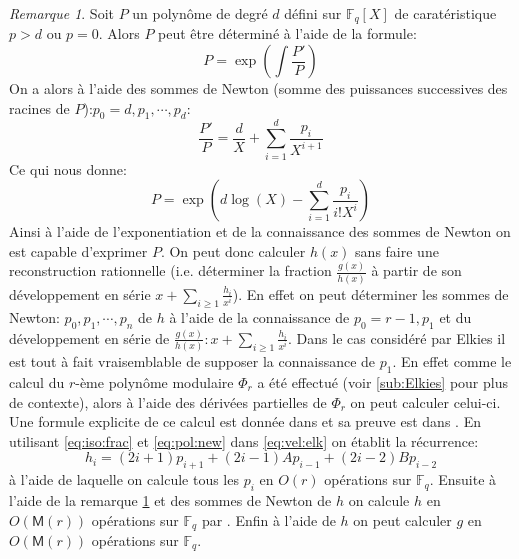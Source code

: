 \documentclass[10pt,a4paper]{book}
\theoremstyle{plain}
\theoremstyle{definition}
\theoremstyle{definition}
\theoremstyle{definition}
\theoremstyle{definition}
\theoremstyle{remark}
\newtheorem{rem}[thm]{Remarque}
\theoremstyle{remark}
\theoremstyle{definition}
\begin{document}
\begin{rem}
\label{rem:pol:rec}
Soit $P$ un polynôme de degré $d$ défini sur $\mathbb{F}_q[X]$ de caratéristique $p>d$ ou $p=0$. Alors $P$ peut être déterminé à l'aide de la formule:
\begin{equation}
P=\exp\left(\int{\frac{P'}{P}}\right)
\end{equation} 
On a alors à l'aide des sommes de Newton (somme des puissances successives des racines de $P$):$p_0=d,p_1, \cdots, p_d$:
\begin{equation}
\label{eq:pol:new}
\frac{P'}{P}= \frac{d}{X} + \sum_{i = 1}^d \frac{p_i}{X^{i+1}}
\end{equation}
Ce qui nous donne:
\begin{equation}
P=\exp\left( d \log(X) - \sum_{i = 1}^{d} \frac{p_i}{i!X^i} \right)
\end{equation} 
Ainsi à l'aide de l'exponentiation et de la connaissance des sommes de Newton 
on est capable d'exprimer $P$.
On peut donc calculer $h(x)$ sans faire une reconstruction rationnelle (i.e. déterminer 
la fraction $\frac{g(x)}{h(x)}$ à partir de son développement en série 
$x+\sum_{i \geqslant 1}\frac{h_i}{x^i}$). En effet on peut déterminer les sommes
de Newton: $p_0,p_1,\cdots, p_n$ de $h$ à l'aide de la connaissance de 
$p_0=r-1, p_1$ et du développement en série de $\frac{g(x)}{h(x)}:x+
\sum_{i \geqslant 1}\frac{h_i}{x^i}$.
Dans le cas considéré par Elkies il est tout à fait vraisemblable de supposer 
la connaissance de $p_1$. En effet comme le calcul du $r$-ème polynôme 
modulaire $\Phi_{r}$ a été effectué (voir \ref{sub:Elkies} pour plus de 
contexte), alors à l'aide des dérivées partielles de $\Phi_{r}$ on peut 
calculer celui-ci. Une formule explicite de ce calcul est donnée dans 
\cite[Theorem 17.22]{ehcc05} et sa preuve est dans \cite[§7]{Schoof95}. En 
utilisant \eqref{eq:iso:frac} et \eqref{eq:pol:new} dans \eqref{eq:vel:elk} on 
établit la récurrence:
\begin{equation}
\label{eq:p:rec}
h_i=(2i+1)p_{i+1}+(2i-1)Ap_{i-1}+(2i-2)Bp_{i-2}
\end{equation}
à l'aide de laquelle on calcule tous les $p_i$ en $O(r)$ opérations sur 
$\mathbb{F}_q$. Ensuite à l'aide de la remarque \ref{rem:pol:rec} et des sommes
de Newton de $h$ on calcule $h$ en $O(\mathsf{M}(r))$ opérations sur 
$\mathbb{F}_q$ par \cite[§2.2]{BMSS08}.
Enfin à l'aide de $h$ on peut calculer $g$ en $O(\mathsf{M}(r))$ opérations sur
$\mathbb{F}_q$.
\end{rem}
 
\end{document}
